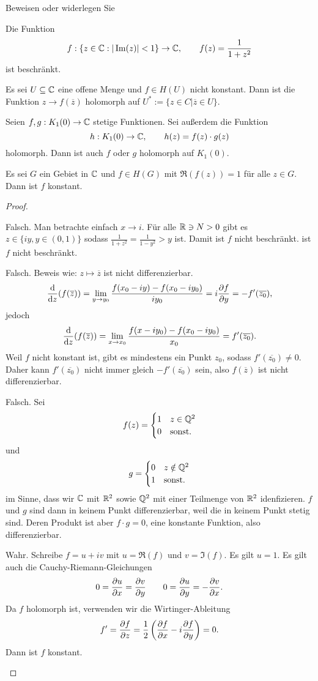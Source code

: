 \begin{Problem}
	Beweisen oder widerlegen Sie
	\begin{parts}
		\item Die Funktion
			\[
			f: \{z\in \mathbb{C}:|\Im(z)|<1\} \to \mathbb{C},\qquad f(z)=\frac{1}{1+z^2}
		\]
		ist beschr\"{a}nkt.
	\item Es sei $U\subseteq \mathbb{C}$ eine offene Menge und $f\in H(U)$ nicht konstant. Dann ist die Funktion $z\to f(\overline{z})$ holomorph auf $U^*:=\{z\in C|\overline{z}\in U\} $.
	\item Seien $f,g:K_1(0)\to \mathbb{C}$ stetige Funktionen. Sei außerdem die Funktion
		 \[
		h:K_1(0)\to \mathbb{C},\qquad h(z)=f(z)\cdot g(z)
	\]
	holomorph. Dann ist auch $f$ oder $g$ holomorph auf $K_1(0)$.
\item Es sei $G$ ein Gebiet in $\mathbb{C}$ und $f\in H(G)$ mit $\Re(f(z))=1$ f\"{u}r alle $z\in G$. Dann ist $f$ konstant.
	\end{parts}
\end{Problem}

\begin{proof}
	\begin{parts}
	\item Falsch. Man betrachte einfach $x\to i$. Für alle $\mathbb{R}\ni N > 0$ gibt es $z\in \{iy, y\in (0,1)\} $ sodass $\frac{1}{1+z^2}=\frac{1}{1-y^2}>y$ ist. Damit ist $f$ nicht beschränkt. 
	ist $f$ nicht beschränkt.
\item Falsch. Beweis wie: $z\mapsto \overline{z}$ ist nicht differenzierbar.
\[
\dv{z}(f(\overline{z}))=\lim_{y \to y_0} \frac{f(x_0-iy)-f(x_0-i y_0)}{iy_0}=i \pdv{f}{y}=-f'(\overline{z_0})
,\]
jedoch
\[
\dv{z}(f(\overline{z}))=\lim_{x \to x_0} \frac{f(x-i y_0) - f(x_0 - i y_0)}{x_0}= f'(\overline{z_0})
.\] 
Weil $f$ nicht konstant ist, gibt es mindestens ein Punkt $z_0$, sodass $f'(\overline{z_0})\neq 0$. Daher kann $f'(\overline{z_0})$ nicht immer gleich $-f'(\overline{z_0})$ sein, also $f(\overline{z})$ ist nicht differenzierbar.
\item Falsch. Sei
\[
f(z)=\begin{cases}
	1 & z\in \mathbb{Q}^2\\
	0 & \text{sonst.}
\end{cases}
\]
und
\[
g=\begin{cases}
	0 & z\notin \mathbb{Q}^2\\
	1 & \text{sonst.}
\end{cases}
\]
im Sinne, dass wir $\mathbb{C}$ mit $\mathbb{R}^2$ sowie $\mathbb{Q}^2$ mit einer Teilmenge von $\mathbb{R}^2$ idenfizieren. $f$ und $g$ sind dann in keinem Punkt differenzierbar, weil die in keinem Punkt stetig sind. Deren Produkt ist aber $f\cdot g = 0$, eine konstante Funktion, also differenzierbar.
\item Wahr. Schreibe $f=u+iv$ mit $u=\Re(f)$ und $v=\Im(f)$. Es gilt $u=1$. Es gilt auch die Cauchy-Riemann-Gleichungen
	\[
		0=\pdv{u}{x}=\pdv{v}{y}\qquad 0=\pdv{u}{y}=-\pdv{v}{x}
	.\] 
	Da $f$ holomorph ist, verwenden wir die Wirtinger-Ableitung
	\[
		f'=\pdv{f}{z}=\frac{1}{2}\left( \pdv{f}{x}-i\pdv{f}{y} \right) =0
	.\] 
	Dann ist $f$ konstant.\qedhere
	\end{parts}
\end{proof}


